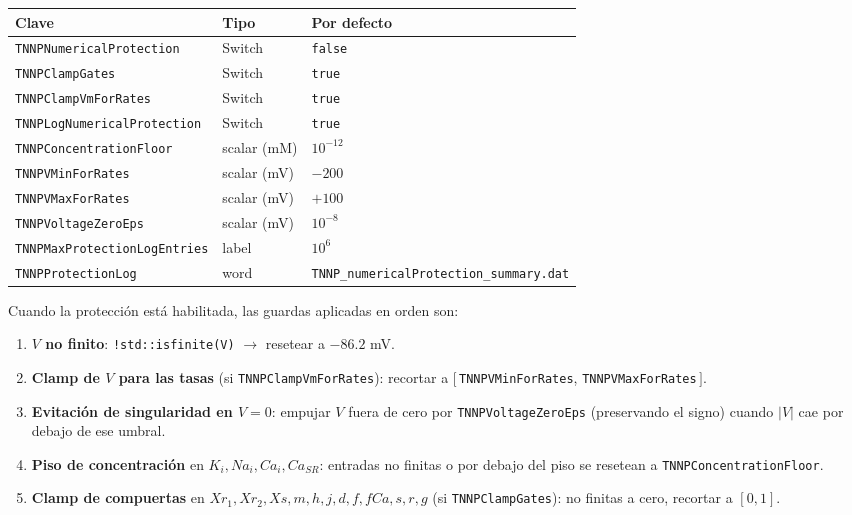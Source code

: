 \documentclass[11pt,a4paper]{article}
\newcommand{\code}[1]{\texttt{\small #1}}
\begin{document}
\begin{center}
\begin{tabular}{@{}lll@{}}
\toprule
Clave & Tipo & Por defecto \\
\midrule
\code{TNNPNumericalProtection} & Switch & \code{false} \\
\code{TNNPClampGates} & Switch & \code{true} \\
\code{TNNPClampVmForRates} & Switch & \code{true} \\
\code{TNNPLogNumericalProtection} & Switch & \code{true} \\
\code{TNNPConcentrationFloor} & scalar (mM) & $10^{-12}$ \\
\code{TNNPVMinForRates} & scalar (mV) & $-200$ \\
\code{TNNPVMaxForRates} & scalar (mV) & $+100$ \\
\code{TNNPVoltageZeroEps} & scalar (mV) & $10^{-8}$ \\
\code{TNNPMaxProtectionLogEntries} & label & $10^{6}$ \\
\code{TNNPProtectionLog} & word & \code{TNNP\_numericalProtection\_summary.dat} \\
\bottomrule
\end{tabular}
\end{center}

Cuando la protección está habilitada, las guardas aplicadas en orden son:
\begin{enumerate}[topsep=0pt,itemsep=2pt]
  \item \textbf{$V$ no finito}: \code{!std::isfinite(V)} $\rightarrow$
        resetear a $-86.2$ mV.
  \item \textbf{Clamp de $V$ para las tasas} (si \code{TNNPClampVmForRates}):
        recortar a $[\,$\code{TNNPVMinForRates}, \code{TNNPVMaxForRates}$\,]$.
  \item \textbf{Evitación de singularidad en $V=0$}: empujar $V$ fuera de cero por
        \code{TNNPVoltageZeroEps} (preservando el signo) cuando
        $\lvert V \rvert$ cae por debajo de ese umbral.
  \item \textbf{Piso de concentración} en $K_{i}, Na_{i}, Ca_{i}, Ca_{SR}$:
        entradas no finitas o por debajo del piso se resetean a
        \code{TNNPConcentrationFloor}.
  \item \textbf{Clamp de compuertas} en $Xr_{1}, Xr_{2}, Xs, m, h, j, d, f, fCa,
        s, r, g$ (si \code{TNNPClampGates}): no finitas a cero,
        recortar a $[0, 1]$.
\end{enumerate}
\end{document}
